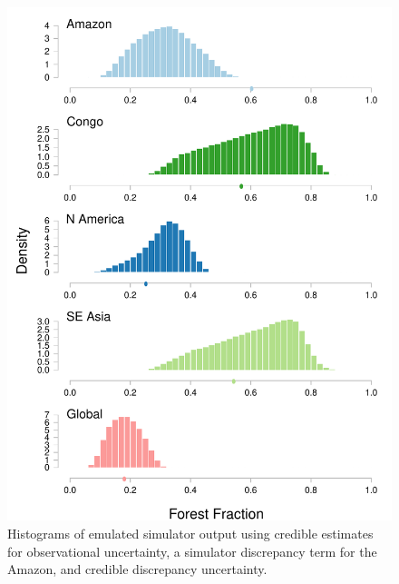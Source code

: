 \documentclass[esd, manuscript]{copernicus}
\begin{document}
\begin{figure}[t]
\includegraphics[width=12cm]{graphics/credible_NROY_hists_disc.pdf}
\caption{Histograms of emulated simulator output using credible estimates for observational uncertainty, a simulator discrepancy term for the Amazon, and credible discrepancy uncertainty.}
\label{fig:credible_NROY_hists_disc}
\end{figure}
\end{document}
